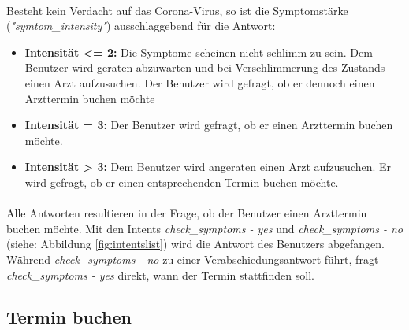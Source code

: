 \documentclass[11pt,a4paper]{article}
\begin{document}
		
		\newpage
		

        \paragraph{}
            Besteht kein Verdacht auf das Corona-Virus, so ist die Symptomstärke (\emph{"symtom\_intensity"}) ausschlaggebend für die Antwort:
            \begin{itemize}
                \item \textbf{Intensität <= 2:} Die Symptome scheinen nicht schlimm zu sein. Dem Benutzer wird geraten abzuwarten und bei
	                Verschlimmerung des Zustands einen Arzt aufzusuchen. Der Benutzer wird gefragt, ob er dennoch einen Arzttermin buchen
                    möchte
                \item \textbf{Intensität = 3:} Der Benutzer wird gefragt, ob er einen Arzttermin buchen möchte.
                \item \textbf{Intensität > 3:} Dem Benutzer wird angeraten einen Arzt aufzusuchen. Er wird gefragt, 
                	ob er einen entsprechenden Termin buchen möchte.
            \end{itemize}

        \paragraph{}
            Alle Antworten resultieren in der Frage, ob der Benutzer einen Arzttermin buchen möchte. Mit den Intents 
            \emph{check\_symptoms - yes} und \emph{check\_symptoms - no} (siehe: Abbildung \ref{fig:intentslist}) wird die Antwort des
            Benutzers abgefangen. Während \emph{check\_symptoms - no} zu einer Verabschiedungsantwort führt, fragt 
            \emph{check\_symptoms - yes} direkt, wann der Termin stattfinden soll.

    \subsection{Termin buchen}
\end{document}
